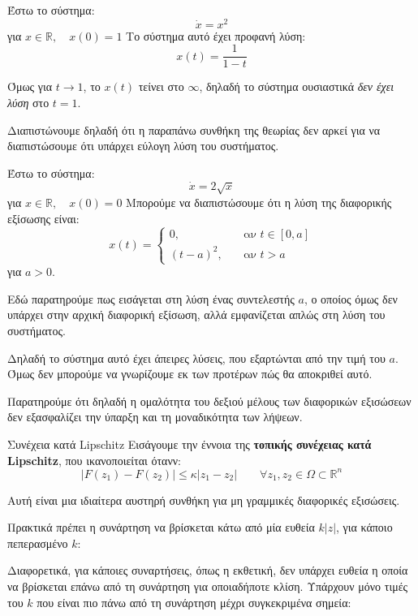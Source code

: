 \documentclass[11pt,a4paper,notitlepage,fleqn,final]{article}
\begin{document}
\begin{exercise}[Παράδειγμα]
	Έστω το σύστημα:
	\[
	\dot x = x^2
	\]
	για \( x\in\mathbb R,\quad x(0) = 1 \)
	\tcblower
	Το σύστημα αυτό έχει προφανή λύση:
	\[
	x(t) = \frac{1}{1-t}
	\]
	
	Όμως για \( t\to 1 \), το \( x(t) \) τείνει στο \( \infty \), δηλαδή το
	σύστημα ουσιαστικά \textit{δεν έχει λύση} στο \( t = 1 \).
	
	Διαπιστώνουμε δηλαδή ότι η παραπάνω συνθήκη της θεωρίας δεν αρκεί για να
	διαπιστώσουμε ότι υπάρχει εύλογη λύση του συστήματος.
\end{exercise}
\begin{exercise}[Παράδειγμα]
	Έστω το σύστημα:\[
	\dot x = 2\sqrt{x}
	\]
	για \( x \in \mathbb R,\quad x(0) = 0 \)
	\tcblower
	Μπορούμε να διαπιστώσουμε ότι η λύση της διαφορικής εξίσωσης είναι:
	\[
	x(t) = \begin{cases}
	0,\quad & \text{αν } t \in [0,a]\\
	(t-a)^2,\quad & \text{αν } t > a
	\end{cases}
	\] για \( a > 0 \).
	
	Εδώ παρατηρούμε πως εισάγεται στη λύση ένας συντελεστής \( a \), ο οποίος όμως δεν υπάρχει
	στην αρχική διαφορική εξίσωση, αλλά εμφανίζεται απλώς στη λύση του συστήματος.
	
	Δηλαδή το σύστημα αυτό έχει άπειρες λύσεις, που εξαρτώνται από την τιμή του \( a \).
	Όμως δεν μπορούμε να γνωρίζουμε εκ των προτέρων πώς θα αποκριθεί αυτό.
\end{exercise}

Παρατηρούμε ότι δηλαδή η ομαλότητα του δεξιού μέλους των διαφορικών εξισώσεων δεν εξασφαλίζει
την ύπαρξη και τη μοναδικότητα των λήψεων.

\begin{defn}{Συνέχεια κατά Lipschitz}{}
	Εισάγουμε την έννοια της \textbf{τοπικής συνέχειας κατά Lipschitz}, που ικανοποιείται ότανν:
	\[
	\left|
	F(z_1) - F(z_2)
	\right|
	\leq \kappa |z_1-z_2|\qquad \forall z_1,z_2 \in \Omega \subset \mathbb R^n
	\]
	
	Αυτή είναι μια ιδιαίτερα αυστηρή συνθήκη για μη γραμμικές διαφορικές εξισώσεις.
\end{defn}

Πρακτικά πρέπει η συνάρτηση να βρίσκεται κάτω από μία ευθεία \( k|z| \), για κάποιο
πεπερασμένο \( k \):

Διαφορετικά, για κάποιες συναρτήσεις, όπως η εκθετική, δεν υπάρχει ευθεία η οποία να βρίσκεται
επάνω από τη συνάρτηση για οποιαδήποτε κλίση. Υπάρχουν μόνο τιμές του \( k \) που είναι
πιο πάνω από τη συνάρτηση μέχρι συγκεκριμένα σημεία:
\end{document}
